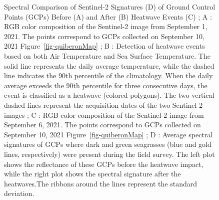 \documentclass[
  number]{elsarticle}
\begin{document}
\label{cell-fig-S2_comparison}
\begin{figure}[H]


\caption{\label{fig-S2_comparison}Spectral Comparison of Sentinel-2
Signatures (D) of Ground Control Points (GCPs) Before (A) and After (B)
Heatwave Events (C) ; A : RGB color composition of the Sentinel-2 image
from September 1, 2021. The points correspond to GCPs collected on
September 10, 2021 Figure~\ref{fig-quiberonMap} ; B : Detection of
heatwave events based on both Air Temperature and Sea Surface
Temperature. The solid line represents the daily average temperature,
while the dashed line indicates the 90th percentile of the climatology.
When the daily average exceeds the 90th percentile for three consecutive
days, the event is classified as a heatwave (colored polygons). The two
vertical dashed lines represent the acquisition dates of the two
Sentinel-2 images ; C : RGB color composition of the Sentinel-2 image
from September 6, 2021. The points correspond to GCPs collected on
September 10, 2021 Figure~\ref{fig-quiberonMap} ; D : Average spectral
signatures of GCPs where dark and green seagrasses (blue and gold lines,
respectively) were present during the field survey. The left plot shows
the reflectance of these GCPs before the heatwave impact, while the
right plot shows the spectral signature after the heatwaves.The ribbons
around the lines represent the standard deviation.}

\end{figure}%


\renewcommand\refname{Bibliography}
  
\end{document}
